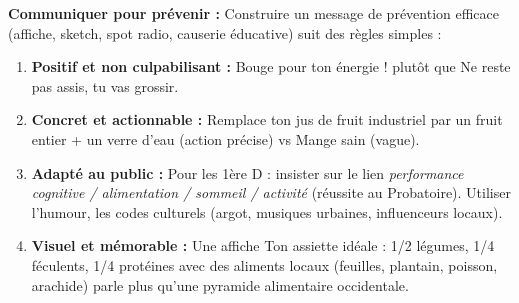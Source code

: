 \documentclass[11pt]{article}
\begin{document}
\textbf{Communiquer pour prévenir :} Construire un message de prévention efficace (affiche, sketch, spot radio, causerie éducative) suit des règles simples :
\begin{enumerate}
    \item \textbf{Positif et non culpabilisant :} \og Bouge pour ton énergie ! \fg{} plutôt que \og Ne reste pas assis, tu vas grossir. \fg{}
    \item \textbf{Concret et actionnable :} \og Remplace ton jus de fruit industriel par un fruit entier + un verre d'eau \fg{} (action précise) vs \og Mange sain \fg{} (vague).
    \item \textbf{Adapté au public :} Pour les 1ère D : insister sur le lien \emph{performance cognitive / alimentation / sommeil / activité} (réussite au Probatoire). Utiliser l'humour, les codes culturels (argot, musiques urbaines, influenceurs locaux).
    \item \textbf{Visuel et mémorable :} Une affiche \og Ton assiette idéale : 1/2 légumes, 1/4 féculents, 1/4 protéines \fg{} avec des aliments locaux (feuilles, plantain, poisson, arachide) parle plus qu'une pyramide alimentaire occidentale.
\end{enumerate}
\end{document}
